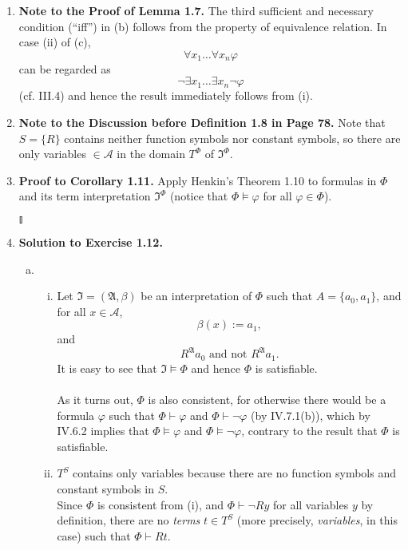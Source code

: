 \begin{enumerate}[1.]
\item \textbf{Note to the Proof of Lemma 1.7.} The third sufficient and necessary condition (``iff'') in (b) follows from the property of equivalence relation. In case (ii) of (c),
\[
\forall x_1 \ldots \forall x_n \varphi
\]
can be regarded as
\[
\neg \exists x_1 \ldots \exists x_n \neg \varphi
\]
(cf. III.4) and hence the result immediately follows from (i).
%
\item \textbf{Note to the Discussion before Definition 1.8 in Page 78.} Note that $S = \{ R \}$ contains neither function symbols nor constant symbols, so there are only variables $\in \mathcal{A}$ in the domain $T^{\Phi}$ of $\mathfrak{I}^{\Phi}$.
%
\item \textbf{Proof to Corollary 1.11.} Apply Henkin's Theorem 1.10 to formulas in $\Phi$ and its term interpretation $\mathfrak{I}^\Phi$ (notice that $\Phi \models \varphi$ for all $\varphi \in \Phi$). \begin{flushright}$\talloblong$\end{flushright}
%
\item \textbf{Solution to Exercise 1.12.}
\begin{enumerate}[(a)]
\item
\begin{enumerate}[(i)]
\item Let $\mathfrak{I} = (\mathfrak{A}, \beta)$ be an interpretation of $\Phi$ such that $A = \{ a_0, a_1 \}$, and for all $x \in \mathcal{A}$,
\[
\beta(x) := a_1,
\]
and
\[
\mbox{$R^{\mathfrak{A}}a_0$ and not $R^{\mathfrak{A}}a_1$}.
\]
It is easy to see that $\mathfrak{I} \models \Phi$ and hence $\Phi$ is satisfiable.\\
\ 
\\As it turns out, $\Phi$ is also consistent, for otherwise there would be a formula $\varphi$ such that $\Phi \vdash \varphi$ and $\Phi \vdash \neg \varphi$ (by IV.7.1(b)), which by IV.6.2 implies that $\Phi \models \varphi$ and $\Phi \models \neg \varphi$, contrary to the result that $\Phi$ is satisfiable.
\item $T^S$ contains only variables because there are no function symbols and constant symbols in $S$.\\
Since $\Phi$ is consistent from (i), and $\Phi \vdash \neg Ry$ for all variables $y$ by definition, there are no \textit{terms} $t \in T^S$ (more precisely, \textit{variables}, in this case) such that $\Phi \vdash Rt$.

\end{enumerate}
\end{enumerate}
\end{enumerate}
